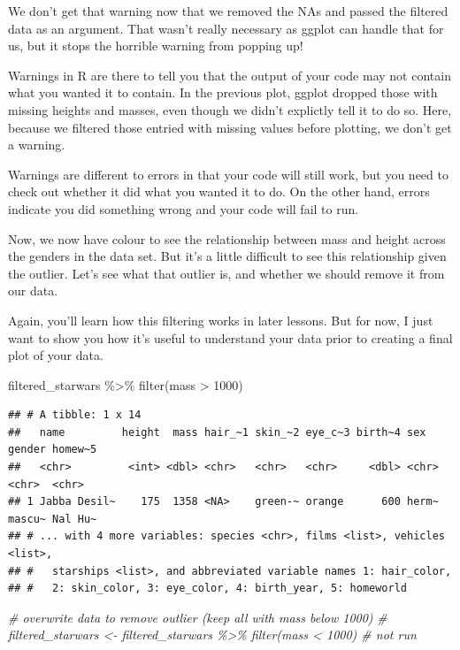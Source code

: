 \documentclass[
]{book}
\newenvironment{Shaded}{\begin{snugshade}}{\end{snugshade}}
\newcommand{\CommentTok}[1]{\textcolor[rgb]{0.56,0.35,0.01}{\textit{#1}}}
\newcommand{\DecValTok}[1]{\textcolor[rgb]{0.00,0.00,0.81}{#1}}
\newcommand{\FunctionTok}[1]{\textcolor[rgb]{0.00,0.00,0.00}{#1}}
\newcommand{\NormalTok}[1]{#1}
\newcommand{\SpecialCharTok}[1]{\textcolor[rgb]{0.00,0.00,0.00}{#1}}
\begin{document}
We don't get that warning now that we removed the NAs and passed the filtered data as an argument. That wasn't really necessary as ggplot can handle that for us, but it stops the horrible warning from popping up!

Warnings in R are there to tell you that the output of your code may not contain what you wanted it to contain. In the previous plot, ggplot dropped those with missing heights and masses, even though we didn't explictly tell it to do so. Here, because we filtered those entried with missing values before plotting, we don't get a warning.

Warnings are different to errors in that your code will still work, but you need to check out whether it did what you wanted it to do. On the other hand, errors indicate you did something wrong and your code will fail to run.

Now, we now have colour to see the relationship between mass and height across the genders in the data set. But it's a little difficult to see this relationship given the outlier. Let's see what that outlier is, and whether we should remove it from our data.

Again, you'll learn how this filtering works in later lessons. But for now, I just want to show you how it's useful to understand your data prior to creating a final plot of your data.

\begin{Shaded}
\begin{Highlighting}[]
\NormalTok{filtered\_starwars }\SpecialCharTok{\%\textgreater{}\%} \FunctionTok{filter}\NormalTok{(mass }\SpecialCharTok{\textgreater{}} \DecValTok{1000}\NormalTok{)}
\end{Highlighting}
\end{Shaded}

\begin{verbatim}
## # A tibble: 1 x 14
##   name         height  mass hair_~1 skin_~2 eye_c~3 birth~4 sex   gender homew~5
##   <chr>         <int> <dbl> <chr>   <chr>   <chr>     <dbl> <chr> <chr>  <chr>  
## 1 Jabba Desil~    175  1358 <NA>    green-~ orange      600 herm~ mascu~ Nal Hu~
## # ... with 4 more variables: species <chr>, films <list>, vehicles <list>,
## #   starships <list>, and abbreviated variable names 1: hair_color,
## #   2: skin_color, 3: eye_color, 4: birth_year, 5: homeworld
\end{verbatim}

\begin{Shaded}
\begin{Highlighting}[]
\CommentTok{\# overwrite data to remove outlier (keep all with mass below 1000)}
\CommentTok{\# filtered\_starwars \textless{}{-} filtered\_starwars \%\textgreater{}\% filter(mass \textless{} 1000) \# not run}
\end{Highlighting}
\end{Shaded}
\end{document}
